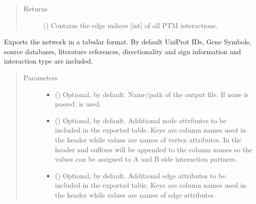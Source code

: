 \documentclass[letterpaper,10pt,english]{sphinxmanual}
\begin{document}
\begin{fulllineitems}
\begin{fulllineitems}
\begin{quote}
\begin{description}
\item[{Returns}] \leavevmode
() \textendash{} Contains the edge indices {[}int{]} of all PTM
interactions.

\end{description}\end{quote}

\end{fulllineitems}


\begin{fulllineitems}
\label{\detokenize{main:pypath.main.PyPath.export_tab}}
Exports the network in a tabular format. By default UniProt IDs,
Gene Symbols, source databases, literature references,
directionality and sign information and interaction type are
included.
\begin{quote}\begin{description}
\item[{Parameters}] \leavevmode\begin{itemize}
\item {} 
 () \textendash{} Optional,  by default. Name/path of the output file.
If none is passed, 
is used.

\item {} 
 () \textendash{} Optional, \sphinxcode{\sphinxupquote{\{\}}} by default. Additional node attributes to
be included in the exported table. Keys are column names
used in the header while values are names of vertex
attributes. In the header  and  suffixes
will be appended to the column names so the values can be
assigned to A and B side interaction partners.

\item {} 
 () \textendash{} Optional, \sphinxcode{\sphinxupquote{\{\}}} by default. Additional edge attributes to
be included in the exported table. Keys are column names
used in the header while values are names of edge
attributes.


\end{itemize}
\end{description}
\end{quote}
\end{fulllineitems}
\end{fulllineitems}
\end{document}
